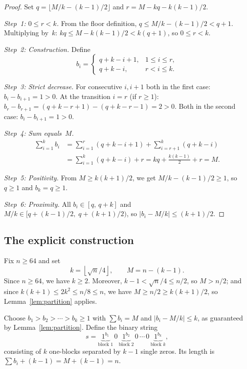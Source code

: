 \documentclass[11pt,a4paper]{article}
\theoremstyle{plain}
\theoremstyle{definition}
\theoremstyle{remark}
\newcommand{\floor}[1]{\left\lfloor #1 \right\rfloor}
\begin{document}
\begin{proof}
  Set $q = \lfloor M/k - (k{-}1)/2 \rfloor$ and
  $r = M - kq - k(k{-}1)/2$.

  \textit{Step~1: $0 \le r < k$.}
  From the floor definition, $q \le M/k - (k{-}1)/2 < q + 1$.
  Multiplying by~$k$: $kq \le M - k(k{-}1)/2 < k(q{+}1)$,
  so $0 \le r < k$.

  \textit{Step~2: Construction.}  Define
  \[
    b_i =
    \begin{cases}
      q + k - i + 1, & 1 \le i \le r, \\
      q + k - i,     & r < i \le k.
    \end{cases}
  \]

  \textit{Step~3: Strict decrease.}
  For consecutive $i, i{+}1$ both in the first case:
  $b_i - b_{i+1} = 1 > 0$.
  At the transition $i = r$ (if $r \ge 1$):
  $b_r - b_{r+1} = (q + k - r + 1) - (q + k - r - 1) = 2 > 0$.
  Both in the second case: $b_i - b_{i+1} = 1 > 0$.

  \textit{Step~4: Sum equals~$M$.}
  \begin{align*}
    \sum_{i=1}^k b_i
    &= \sum_{i=1}^{r}(q + k - i + 1) + \sum_{i=r+1}^{k}(q + k - i) \\
    &= \sum_{i=1}^{k}(q + k - i) + r
    = kq + \frac{k(k{-}1)}{2} + r = M.
  \end{align*}

  \textit{Step~5: Positivity.}
  From $M \ge k(k{+}1)/2$, we get $M/k - (k{-}1)/2 \ge 1$, so
  $q \ge 1$ and $b_k = q \ge 1$.

  \textit{Step~6: Proximity.}
  All $b_i \in [q,\, q + k]$ and
  $M/k \in [q + (k{-}1)/2,\; q + (k{+}1)/2)$, so
  $|b_i - M/k| \le (k{+}1)/2$.
\end{proof}

\subsection{The explicit construction}

Fix $n \ge 64$ and set
\begin{equation}\label{eq:params}
  k = \floor{\sqrt{n}/4}, \qquad M = n - (k - 1).
\end{equation}
Since $n \ge 64$, we have $k \ge 2$.  Moreover,
$k - 1 < \sqrt{n}/4 \le n/2$, so $M > n/2$; and since
$k(k{+}1) \le 2k^2 \le n/8 \le n$, we have
$M \ge n/2 \ge k(k{+}1)/2$, so Lemma~\ref{lem:partition} applies.

Choose $b_1 > b_2 > \cdots > b_k \ge 1$ with $\sum b_i = M$ and
$|b_i - M/k| \le k$, as guaranteed by Lemma~\ref{lem:partition}.
Define the binary string
\begin{equation}\label{eq:string}
  s = \underbrace{1^{b_1}}_{\text{block~1}}\,0\,
      \underbrace{1^{b_2}}_{\text{block~2}}\,0\,
      \cdots\,0\,
      \underbrace{1^{b_k}}_{\text{block~$k$}},
\end{equation}
consisting of $k$ one-blocks separated by $k - 1$ single zeros.  Its
length is $\sum b_i + (k{-}1) = M + (k{-}1) = n$.
\end{document}
